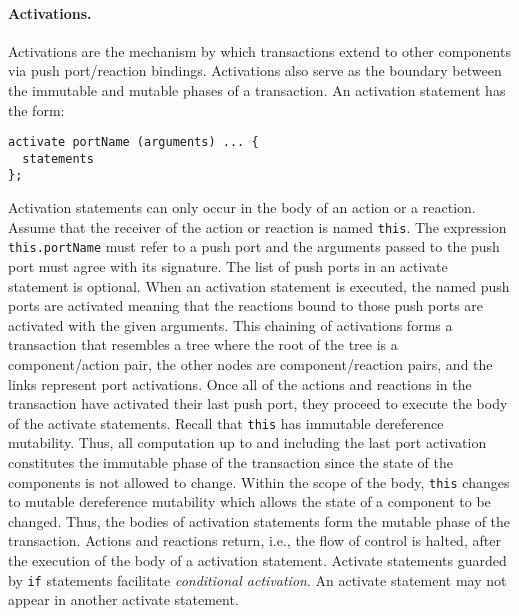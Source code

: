 \paragraph{Activations.}
Activations are the mechanism by which transactions extend to other components via push port/reaction bindings.
Activations also serve as the boundary between the immutable and mutable phases of a transaction.
An activation statement has the form:
\begin{verbatim}
activate portName (arguments) ... {
  statements
};
\end{verbatim}
Activation statements can only occur in the body of an action or a reaction.
Assume that the receiver of the action or reaction is named \verb+this+.
The expression \verb+this.portName+ must refer to a push port and the arguments passed to the push port must agree with its signature.
The list of push ports in an activate statement is optional.
When an activation statement is executed, the named push ports are activated meaning that the reactions bound to those push ports are activated with the given arguments.
This chaining of activations forms a transaction that resembles a tree where the root of the tree is a component/action pair, the other nodes are component/reaction pairs, and the links represent port activations.
Once all of the actions and reactions in the transaction have activated their last push port, they proceed to execute the body of the activate statements.
Recall that \verb+this+ has immutable dereference mutability.
Thus, all computation up to and including the last port activation constitutes the immutable phase of the transaction since the state of the components is not allowed to change.
Within the scope of the body, \verb+this+ changes to mutable dereference mutability which allows the state of a component to be changed.
Thus, the bodies of activation statements form the mutable phase of the transaction.
Actions and reactions return, i.e., the flow of control is halted, after the execution of the body of a activation statement.
Activate statements guarded by \verb+if+ statements facilitate \emph{conditional activation}.
An activate statement may not appear in another activate statement.

